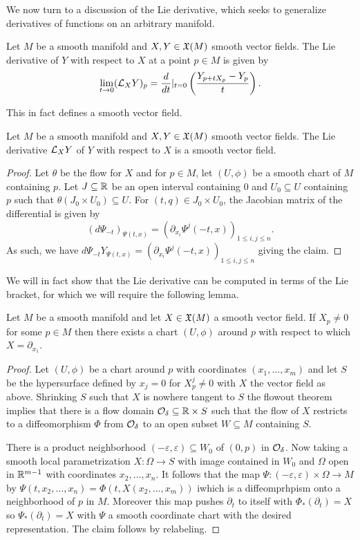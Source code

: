 We now turn to a discussion of the Lie derivative, which seeks to generalize derivatives of functions on an arbitrary manifold. 
\begin{definition}\label{def: Lie derivative}
    Let $M$ be a smooth manifold and $X,Y\in\mathfrak{X}(M)$ smooth vector fields. The Lie derivative of $Y$ with respect to $X$ at a point $p\in M$ is given by 
    $$\lim_{t\to0}(\mathcal{L}_{X}Y)_{p}=\frac{d}{dt}|_{t=0}\left(\frac{Y_{p+tX_{p}}-Y_{p}}{t}\right).$$
\end{definition}
This in fact defines a smooth vector field. 
\begin{lemma}\label{lem: Lie derivative is a smooth vector field}
    Let $M$ be a smooth manifold and $X,Y\in\mathfrak{X}(M)$ smooth vector fields. The Lie derivative $\mathcal{L}_{X}Y$ of $Y$ with respect to $X$ is a smooth vector field. 
\end{lemma}
\begin{proof}
    Let $\theta$ be the flow for $X$ and for $p\in M$, let $(U,\phi)$ be a smooth chart of $M$ containing $p$. Let $J\subseteq\mathbb{R}$ be an open interval containing 0 and $U_{0}\subseteq U$ containing $p$ such that $\theta(J_{0}\times U_{0})\subseteq U$. For $(t,q)\in J_{0}\times U_{0}$, the Jacobian matrix of the differential is given by 
    $$(d\Psi_{-t})_{\Psi(t,x)}=(\partial_{x_{i}}\Psi^{j}(-t,x))_{1\leq i,j\leq n}.$$
    As such, we have $d\Psi_{-t}Y_{\Psi(t,x)}=(\partial_{x_{i}}\Psi^{j}(-t,x))_{1\leq i,j\leq n}$ giving the claim. 
\end{proof}
We will in fact show that the Lie derivative can be computed in terms of the Lie bracket, for which we will require the following lemma. 
\begin{lemma}\label{lem: canonical form for a smooth vector field}
    Let $M$ be a smooth manifold and let $X\in\mathfrak{X}(M)$ a smooth vector field. If $X_{p}\neq0$ for some $p\in M$ then there exists a chart $(U,\phi)$ around $p$ with respect to which $X=\partial_{x_{1}}$.
\end{lemma}
\begin{proof}
    Let $(U,\phi)$ be a chart around $p$ with coordinates $(x_{1},\dots,x_{m})$ and let $S$ be the hypersurface defined by $x_{j}=0$ for $X^{j}_{p}\neq0$ with $X$ the vector field as above. Shrinking $S$ such that $X$ is nowhere tangent to $S$ the flowout theorem \cite[Thm. 9.20]{LeeSM} implies that there is a flow domain $\mathcal{O}_{\delta}\subseteq\mathbb{R}\times S$ such that the flow of $X$ restricts to a diffeomorphism $\Phi$ from $\mathcal{O}_{\delta}$ to an open subset $W\subseteq M$ containing $S$. 

    There is a product neighborhood $(-\varepsilon,\varepsilon)\subseteq W_{0}$ of $(0,p)$ in $\mathcal{O}_{\delta}$. Now taking a smooth local parametrization $X:\Omega\to S$ with image contained in $W_{0}$ and $\Omega$ open in $\mathbb{R}^{m-1}$ with coordinates $x_{2},\dots,x_{n}$. It follows that the map $\Psi:(-\varepsilon,\varepsilon)\times\Omega\to M$ by $\Psi(t,x_{2},\dots,x_{n})=\Phi(t,X(x_{2},\dots,x_{m}))$ iwhich is a diffeomprhpism onto a neighborhood of $p$ in $M$. Moreover this map pushes $\partial_{t}$ to itself with $\Phi_{*}(\partial_{t})=X$ so $\Psi_{*}(\partial_{t})=X$ with $\Psi$ a smooth coordinate chart with the desired representation. The claim follows by relabeling. 
\end{proof}